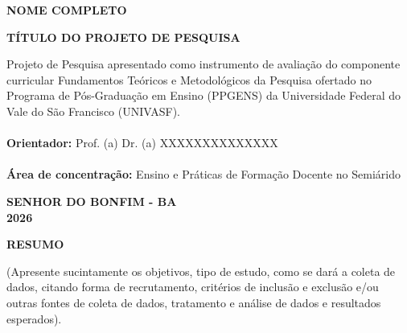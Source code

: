 \documentclass[
  brazilian,
  12pt,
  letterpaper,
  DIV=11,
  numbers=noendperiod]{scrartcl}
\renewcommand*\contentsname{Índice}
\newcommand\contentsname{Índice}
\begin{document}
\begin{titlepage}
    \begin{center}
        \textbf{NOME COMPLETO}
        
        \vspace{4cm}
        
        \textbf{TÍTULO DO PROJETO DE PESQUISA}
        
        \vspace{3cm}
        
        \begin{flushright}
            \begin{minipage}{0.5\textwidth}
                \singlespacing
                Projeto de Pesquisa apresentado como instrumento de avaliação do componente curricular Fundamentos Teóricos e Metodológicos da Pesquisa ofertado no Programa de Pós-Graduação em Ensino (PPGENS) da Universidade Federal do Vale do São Francisco (UNIVASF).\\
                \\
                \textbf{Orientador:} Prof. (a) Dr. (a) XXXXXXXXXXXXXX\\
                \\
                \textbf{Área de concentração:} Ensino e Práticas de Formação Docente no Semiárido
            \end{minipage}
        \end{flushright}
        
        \vfill
        
        \textbf{SENHOR DO BONFIM - BA}\\
        \textbf{2026}
    \end{center}
\end{titlepage}

\clearpage

\begin{center}
\textbf{RESUMO}
\end{center}

(Apresente sucintamente os objetivos, tipo de estudo, como se dará a
coleta de dados, citando forma de recrutamento, critérios de inclusão e
exclusão e/ou outras fontes de coleta de dados, tratamento e análise de
dados e resultados esperados).

\clearpage

\renewcommand{\contentsname}{\centerline{SUMÁRIO}}
\tableofcontents

\clearpage

\pagestyle{fancy} \fancyhf{} \fancyhead[R]{\thepage}
\renewcommand{\headrulewidth}{0pt}
\end{document}
